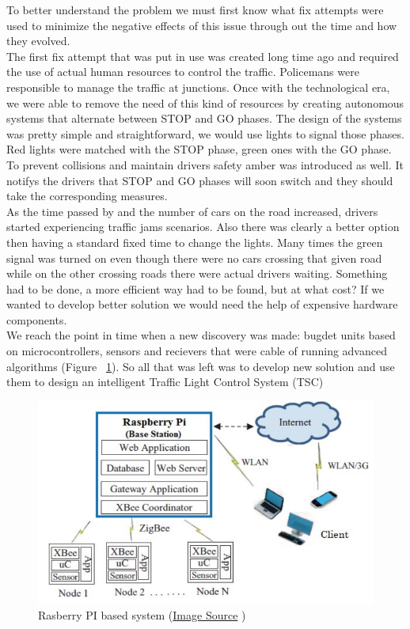 \documentclass[17pt]{report}
\begin{document}
\indent \indent
To better understand the problem we must first know what fix attempts 
were used to minimize the negative effects of this issue through
out the time and how they evolved.\\
\indent \indent
The first fix attempt that was put in use was created long time ago and required
the use of actual human resources to control the traffic. Policemans were
responsible to manage the traffic at junctions. Once with the  technological
era, we were able to remove the need of this kind of resources by creating
autonomous systems that alternate between STOP and GO phases. The design of the 
systems was pretty simple and straightforward, we would use lights to signal 
those phases. Red lights were matched with the STOP phase, green ones with the
GO phase. To prevent collisions and maintain drivers safety amber was
introduced as well. It notifys the drivers that STOP and GO phases will soon
switch and they should take the corresponding measures.\\
\indent \indent
As the time passed by and the number of cars on the road increased, drivers 
started experiencing traffic jams scenarios. Also there was clearly a better
option then having a standard fixed time to change the lights. Many times
the green signal was turned on even though there were no cars crossing that
given road while on the other crossing roads there were actual drivers waiting.
Something had to be done, a more efficient way had to be found, but at what
cost? If we wanted to develop better solution we would need the help of
expensive hardware components.\\
\indent \indent
We reach the point in time when a new discovery was made: bugdet units based
on  microcontrollers, sensors and recievers \cite{Deshmukh2016} that were
cable of running advanced algorithms (Figure ~\ref{fig:PI}). So all that was left was to develop 
new solution and use them to design an intelligent Traffic Light Control
System (TSC)\\
\begin{figure}[h!]
    \includegraphics[width=\textwidth]{PiSystems.png}
    \caption{Rasberry PI based system 
    (\href{https://www.semanticscholar.org/paper/A-low-cost-environment-monitoring-system-using-Pi-Deshmukh-Shinde/e05a1fb72b08803d40dc06fa202241636fb82c21}{Image Source} \textcopyright ) }
    \label{fig:PI}
\end{figure}
\\
\end{document}
